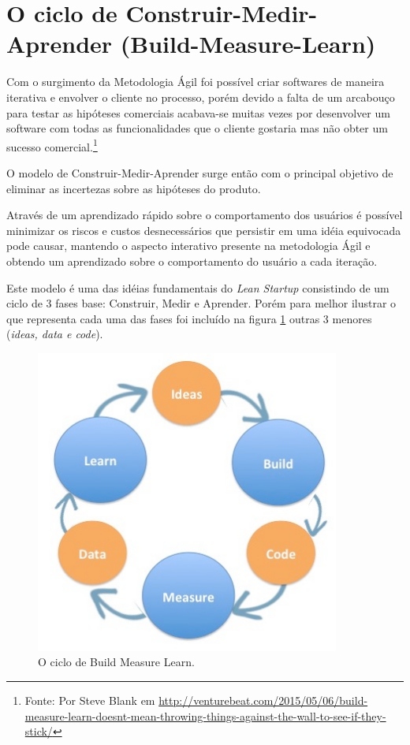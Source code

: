 \section{O ciclo de Construir-Medir-Aprender (Build-Measure-Learn)}
\par Com o surgimento da Metodologia Ágil foi possível criar softwares de maneira iterativa e envolver o cliente no processo, porém devido a falta de um arcabouço para testar as hipóteses comerciais acabava-se muitas vezes por desenvolver um software com todas as funcionalidades que o cliente gostaria mas não obter um sucesso comercial.\footnote{Fonte: Por Steve Blank em \url{http://venturebeat.com/2015/05/06/build-measure-learn-doesnt-mean-throwing-things-against-the-wall-to-see-if-they-stick/}}
\par O modelo de Construir-Medir-Aprender surge então com o principal objetivo de eliminar as incertezas sobre as hipóteses do produto. 
\par Através de um aprendizado rápido sobre o comportamento dos usuários é possível minimizar os riscos e custos desnecessários que persistir em uma idéia equivocada pode causar, mantendo o aspecto interativo presente na metodologia Ágil e obtendo um aprendizado sobre o comportamento do usuário a cada iteração. 
\par Este modelo é uma das idéias fundamentais do \emph{Lean Startup} consistindo de um ciclo de 3 fases base: Construir, Medir e Aprender. Porém para melhor ilustrar o que representa cada uma das fases foi incluído na figura \ref{fig:buildmeasurelearn} outras 3 menores (\emph{ideas, data e code}).
\begin{figure}[htb]
\centering
\includegraphics[width=10cm]{figuras/buildmeasurelearn}
\caption{\label{fig:buildmeasurelearn}O ciclo de Build Measure Learn.}
\end{figure}
